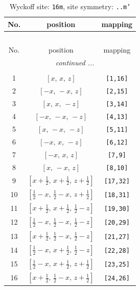 \documentclass[fleqn,8pt]{jsarticle}
\begin{document}
\renewcommand{\arraystretch}{1.2}
\begin{longtable}{ccc}
\caption{Wyckoff site: {\tt 16m}, site symmetry: {\tt ..m'}}
 \\
 \hline \hline
No. & position & mapping \\ \hline \endfirsthead

\multicolumn{2}{l}{\tablename\ \thetable{}} \\
 \hline \hline
No. & position & mapping \\ \hline \endhead

 \hline \hline
\multicolumn{2}{r}{\footnotesize\it continued ...} \\ \endfoot

 \hline \hline
\multicolumn{2}{r}{} \\ \endlastfoot

1 & $\left[ x,\, x,\, z \right]$ & {\tt [1,16]} \\ \hline
2 & $\left[ - x,\, - x,\, z \right]$ & {\tt [2,15]} \\ \hline
3 & $\left[ x,\, x,\, - z \right]$ & {\tt [3,14]} \\ \hline
4 & $\left[ - x,\, - x,\, - z \right]$ & {\tt [4,13]} \\ \hline
5 & $\left[ x,\, - x,\, - z \right]$ & {\tt [5,11]} \\ \hline
6 & $\left[ - x,\, x,\, - z \right]$ & {\tt [6,12]} \\ \hline
7 & $\left[ - x,\, x,\, z \right]$ & {\tt [7,9]} \\ \hline
8 & $\left[ x,\, - x,\, z \right]$ & {\tt [8,10]} \\ \hline
9 & $\left[ x + \frac{1}{2},\, x + \frac{1}{2},\, z + \frac{1}{2} \right]$ & {\tt [17,32]} \\ \hline
10 & $\left[ \frac{1}{2} - x,\, \frac{1}{2} - x,\, z + \frac{1}{2} \right]$ & {\tt [18,31]} \\ \hline
11 & $\left[ x + \frac{1}{2},\, x + \frac{1}{2},\, \frac{1}{2} - z \right]$ & {\tt [19,30]} \\ \hline
12 & $\left[ \frac{1}{2} - x,\, \frac{1}{2} - x,\, \frac{1}{2} - z \right]$ & {\tt [20,29]} \\ \hline
13 & $\left[ x + \frac{1}{2},\, \frac{1}{2} - x,\, \frac{1}{2} - z \right]$ & {\tt [21,27]} \\ \hline
14 & $\left[ \frac{1}{2} - x,\, x + \frac{1}{2},\, \frac{1}{2} - z \right]$ & {\tt [22,28]} \\ \hline
15 & $\left[ \frac{1}{2} - x,\, x + \frac{1}{2},\, z + \frac{1}{2} \right]$ & {\tt [23,25]} \\ \hline
16 & $\left[ x + \frac{1}{2},\, \frac{1}{2} - x,\, z + \frac{1}{2} \right]$ & {\tt [24,26]} \\
\end{longtable}
\end{document}
